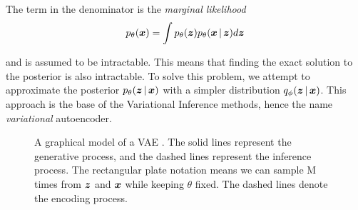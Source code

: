The term in the denominator is the \emph{marginal likelihood}
\begin{equation}
p_{\theta}(\vx) = \int p_{\theta}(\vz)p_{\theta}\given{\vx}{\vz} d\vz
\label{eq:maximize_vae}
\end{equation}

and is assumed to be intractable. This means that finding the exact solution to the posterior is also intractable. To solve this problem, we attempt to approximate the posterior $\ptheta \given{\vz}{\vx}$ with a simpler distribution $\qphi \given{\vz}{\vx}$. This approach is the base of the Variational Inference methods, hence the name \textit{variational} autoencoder.

\begin{figure}
\centering
{}
\caption{A graphical model of a VAE \parencite{kingma2013auto}. The solid lines represent the generative process, and the dashed lines represent the inference process. The rectangular plate notation means we can sample M times from $\boldsymbol{z}$ and $\boldsymbol{x}$ while keeping $\theta$ fixed. The dashed lines denote the encoding process.}
\end{figure}

